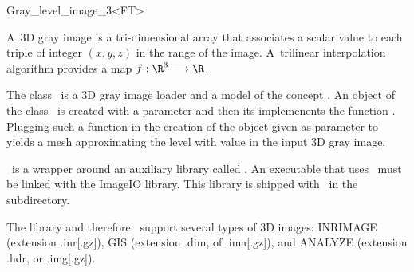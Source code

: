 

\begin{ccRefClass}{Gray_level_image_3<FT>}  %


\ccDefinition

 A~3D gray image is a
tri-dimensional array that associates a scalar value to each triple of
integer $(x, y, z)$ in the range of the image. A~trilinear interpolation
algorithm provides a map \begin{math}f : \R^3 \longrightarrow \R\end{math}.

The class \ccRefName\ is a 3D gray image loader and a model
of the concept .
An object of the class \ccRefName\  is created with a parameter
 and then its   implemenents
the function .
Plugging such a function in the creation of the 
object given as parameter  to  yields
a mesh approximating the level with value 
in the input 3D gray image.
 


\ccRefName\ is a wrapper around an auxiliary library called
. An executable that uses \ccRefName\ must be linked with the ImageIO
library. This library is shipped with \cgal\ in the
 subdirectory.

The library  and therefore \ccRefName\ support
several types of 3D images: INRIMAGE (extension .inr[.gz]), GIS (extension
.dim, of .ima[.gz]), and ANALYZE (extension .hdr, or .img[.gz]).



\end{ccRefClass}
